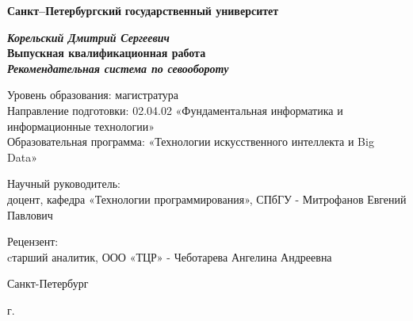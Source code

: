\begin{titlepage}
\begin{center}

\textbf{Санкт--Петербургский}
\textbf{государственный университет}

\vspace{35mm}

\textbf{\textit{\large Корельский Дмитрий Сергеевич}} \\[8mm]
\textbf{\large Выпускная квалификационная работа}\\[3mm]
\textbf{\textit{\large Рекомендательная система по севообороту}}

\vspace{20mm}
Уровень образования: магистратура\\
Направление подготовки: 02.04.02 «Фундаментальная информатика и информационные технологии»\\
Образовательная программа: «Технологии искусственного интеллекта и Big Data»\\[25mm]

\begin{flushright}
\begin{minipage}[t]{0.65\textwidth}
{Научный руководитель:} \\
доцент, кафедра «Технологии программирования», СПбГУ - Митрофанов Евгений Павлович

\vspace{10mm}

{Рецензент:} \\
cтарший аналитик, ООО «ТЦР» - Чеботарева Ангелина Андреевна
\end{minipage}
\end{flushright}

\vfill
{Санкт-Петербург}
\par{\the\year{} г.}
\end{center}
\end{titlepage}
\restoregeometry
\addtocounter{page}{1}
